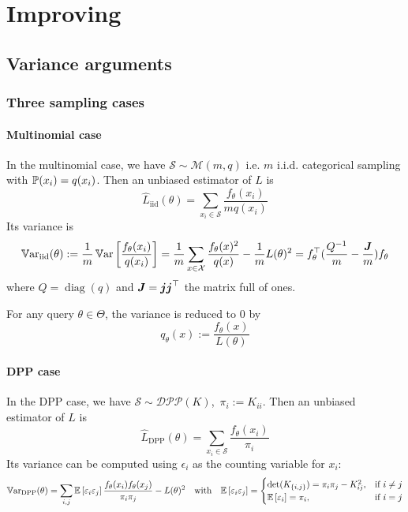 \chapter{Improving}
\section{Variance arguments}
\subsection{Three sampling cases}
\subsubsection{Multinomial case}


In the multinomial case, we have $\mathcal S \sim \mathcal M(m, q)$ i.e. $m$ i.i.d. categorical sampling with $\mathbb{P}(x_i) = q(x_i)$.
Then an unbiased estimator of $L$ is
\begin{equation*}
	\hat L_{\textrm{iid}}(\theta) = \sum_{x_i\in \mathcal S} \frac{f_\theta(x_i)}{m q(x_i)}
\end{equation*}
Its variance is
\begin{equation}
	\operatorname{\mathbb V ar}_{\textrm{iid}}(\theta) :=\frac{1}{m} \operatorname{\mathbb V ar}\left[\frac {f_{\theta}(x_i)} {q(x_i)}\right] 
	=\frac{1}{m} \sum_{x \in \mathcal{X}} \frac{f_{\theta}(x)^{2}}{q(x)} -\frac{1}{m} L(\theta)^{2} = f_\theta^\top(\frac{Q^{-1}} m - \frac{\boldsymbol{J}} m)f_\theta
\end{equation}
where $Q = \operatorname{diag}(q)$ and $\boldsymbol{J} = \boldsymbol{j} \boldsymbol{j} ^\top$ the matrix full of ones. 

For any query $\theta \in \Theta$, the variance is reduced to 0 by
$$
q_{\theta}(x):=\frac{ f_{\theta}(x)}{L(\theta)}
$$


\subsubsection{DPP case}
In the DPP case, we have $ \mathcal S \sim \mathcal{DPP}(K)$, \,$\pi_i := K_{ii}$. Then an unbiased estimator of $L$ is
\begin{equation*}
	\hat L_{\textrm{DPP}}(\theta) = \sum_{x_i\in \mathcal S} \frac{f_\theta(x_i)}{\pi_i}
\end{equation*}
Its variance can be computed using $\epsilon_i$ as the counting variable for $x_i$:
\begin{equation*}
	\operatorname{\mathbb V ar}_{\textrm{DPP}}(\theta)
=\sum_{i, j}\mathbb{E}\left[\varepsilon_{i} \varepsilon_{j}\right] \frac{f_\theta(x_{i}) f_\theta(x_{j})} {\pi_{i} \pi_{j}}  - L(\theta)^{2}
\quad \text{with} \quad
\mathbb{E}\left[\varepsilon_{i} \varepsilon_{j}\right]=
\begin{cases}
	\det(K_{\{i, j\}})=\pi_{i} \pi_{j}-K_{ij}^{2}, & \text{if } i \neq j \\
	\mathbb{E}\left[\varepsilon_{i}\right]=\pi_{i},&\text{if } i = j
\end{cases}
\end{equation*}



